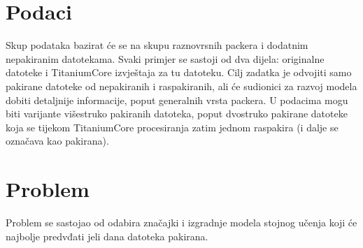 \documentclass[conference]{IEEEtran}
\begin{document}
\section{Podaci}
Skup podataka bazirat će se na skupu raznovrsnih packera 
i dodatnim nepakiranim datotekama. Svaki primjer se sastoji 
od dva dijela: originalne datoteke i TitaniumCore izvještaja 
za tu datoteku. 
Cilj zadatka je odvojiti samo pakirane datoteke od 
nepakiranih i raspakiranih, ali će sudionici za razvoj 
modela dobiti detaljnije informacije, poput generalnih 
vrsta packera. U podacima mogu biti varijante višestruko 
pakiranih datoteka, poput dvostruko pakirane datoteke 
koja se tijekom TitaniumCore procesiranja zatim 
jednom raspakira (i dalje se označava kao pakirana).

\section{Problem}
Problem se sastojao od odabira značajki i izgradnje modela stojnog učenja koji će najbolje predvđati jeli dana datoteka pakirana.
\end{document}

